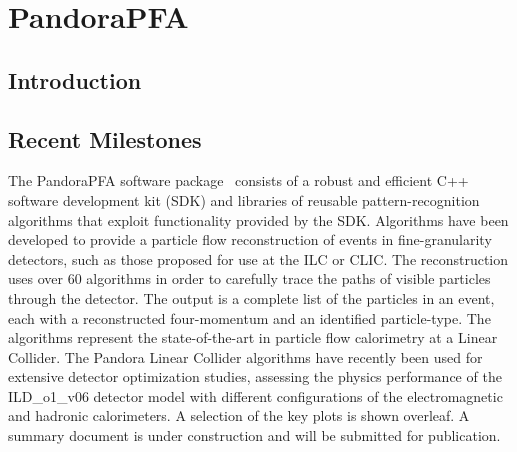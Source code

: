 \section{PandoraPFA}


\subsection{Introduction}
\subsection{Recent Milestones}
The PandoraPFA software package~\cite{Thomson200925,Marshall2013153}
consists of a robust and efficient C++ software development kit (SDK) and
libraries of reusable pattern-recognition algorithms that exploit functionality
provided by the SDK. Algorithms have been developed to provide a particle flow
reconstruction of events in fine-granularity detectors, such as those proposed
for use at the ILC or CLIC. The reconstruction uses over 60 algorithms in order
to carefully trace the paths of visible particles through the detector. The
output is a complete list of the particles in an event, each with a
reconstructed four-momentum and an identified particle-type. The algorithms
represent the state-of-the-art in particle flow calorimetry at a Linear
Collider. The Pandora Linear Collider algorithms have recently been used for
extensive detector optimization studies, assessing the physics performance of
the ILD\_o1\_v06 detector model with different configurations of the
electromagnetic and hadronic calorimeters. A selection of the key plots is shown
overleaf. A summary document is under construction and will be submitted for
publication.

